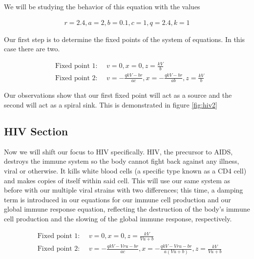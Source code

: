 \documentclass{article}
\begin{document}
We will be studying the behavior of this equation with the values

\begin{equation}
    \begin{split}
        r = 2.4, a = 2, b=0.1,c=1,q=2.4,k=1
    \end{split}
    \label{eq:vals}
\end{equation}

Our first step is to determine the fixed points of the system of equations. In this case there are two.

\begin{equation}
	\begin{split}
		&\text{Fixed point 1: } \quad v=0,x=0,z={\frac {kV}{b}} \\
		&\text{Fixed point 2: } \quad v=-{\frac {qkV-br}{ac}},x=-{\frac {qkV-br}{ab}},z={\frac {kV}{b}} 
	\end{split}
	\label{eq:fixed}
\end{equation}

Our observations show that our first fixed point will act as a source and the second will act as a spiral sink. This is demonstrated in figure \ref{fig:hiv2}





\subsection{HIV Section}
Now we will shift our focus to HIV specifically. HIV, the precursor to AIDS, destroys the immune system so the body cannot fight back against any illness, viral or otherwise. It kills white blood cells (a specific type known as a CD4 cell) and makes copies of itself within said cell. This will use our same system as before with our multiple viral strains with two differences; this time, a damping term is introduced in our equations for our immune cell production and our global immune response equation, reflecting the destruction of the body’s immune cell production and the slowing of the global immune response, respectively.

\begin{equation}
	\begin{split}
		&\text{Fixed point 1: } \quad v=0,x=0,z={\frac {kV}{Vu+b}}   \\
		&\text{Fixed point 2: } \quad  v=-{\frac {qkV-Vru-br}{ac}},x=-{\frac {qkV-Vru-br}{a \left( Vu+b \right) }},z={\frac {kV}{Vu+b}}
	\end{split}
	\label{eq:fixed}
\end{equation}
\end{document}
